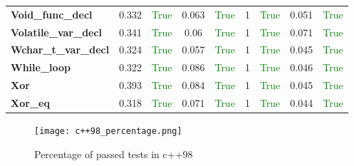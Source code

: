 \documentclass{article}
\begin{document}
\begin{xltabular}{\textwidth}{lcccccccc}
\textbf{{\fontsize{10}{12}\selectfont Void\_func\_decl}}& 0.332&\textcolor{green}{True}& 0.063&\textcolor{green}{True}& 1&\textcolor{green}{True}& 0.051&\textcolor{green}{True} \\[0.5ex]
\textbf{{\fontsize{10}{12}\selectfont Volatile\_var\_decl}}& 0.341&\textcolor{green}{True}& 0.06&\textcolor{green}{True}& 1&\textcolor{green}{True}& 0.071&\textcolor{green}{True} \\[0.5ex]
\textbf{{\fontsize{10}{12}\selectfont Wchar\_t\_var\_decl}}& 0.324&\textcolor{green}{True}& 0.057&\textcolor{green}{True}& 1&\textcolor{green}{True}& 0.045&\textcolor{green}{True} \\[0.5ex]
\textbf{{\fontsize{10}{12}\selectfont While\_loop}}& 0.322&\textcolor{green}{True}& 0.086&\textcolor{green}{True}& 1&\textcolor{green}{True}& 0.046&\textcolor{green}{True} \\[0.5ex]
\textbf{{\fontsize{10}{12}\selectfont Xor}}& 0.393&\textcolor{green}{True}& 0.084&\textcolor{green}{True}& 1&\textcolor{green}{True}& 0.045&\textcolor{green}{True} \\[0.5ex]
\textbf{{\fontsize{10}{12}\selectfont Xor\_eq}}& 0.318&\textcolor{green}{True}& 0.071&\textcolor{green}{True}& 1&\textcolor{green}{True}& 0.044&\textcolor{green}{True} \\[0.5ex]
\bottomrule
\end{xltabular}
\newpage
\begin{figure}[h!]
\centering
\texttt{[image: c++98\_percentage.png]}
\caption{Percentage of passed tests in c++98}
\label{fig:c++98_percentage}
\end{figure}
\newpage
\end{document}
